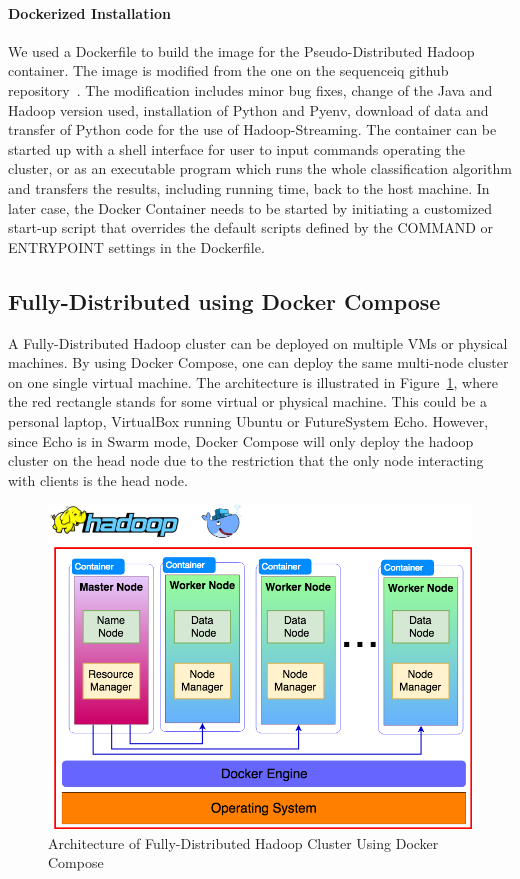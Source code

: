 \paragraph{Dockerized Installation} We used a Dockerfile to build the 
image for the Pseudo-Distributed Hadoop container. The image is
modified from the one on the sequenceiq github
repository~\cite{hid-sp18-405-hadoop-sequenceiq}. The modification
includes minor bug fixes, change of the Java and Hadoop version used,
installation of Python and Pyenv, download of data and transfer of
Python code for the use of Hadoop-Streaming. The container can be
started up with a shell interface for user to input commands operating
the cluster, or as an executable program which runs the whole
classification algorithm and transfers the results, including running
time, back to the host machine. In later case, the Docker Container
needs to be started by initiating a customized start-up script that
overrides the default scripts defined by the COMMAND or ENTRYPOINT
settings in the Dockerfile.


\subsection{Fully-Distributed using Docker Compose}

A Fully-Distributed Hadoop cluster can be deployed on multiple VMs or
physical machines. By using Docker Compose, one can deploy the same
multi-node cluster on one single virtual machine.  The architecture is
illustrated in Figure~\ref{f:hadoop-compose}, where the red rectangle
stands for some virtual or physical machine. This could be a personal
laptop, VirtualBox running Ubuntu or FutureSystem Echo. However, since
Echo is in Swarm mode, Docker Compose will only deploy the hadoop
cluster on the head node due to the restriction that the only node
interacting with clients is the head node.

\begin{figure}[!ht]
	\centering\includegraphics[width=\columnwidth]{images/hadoop-docker-compose.png}
	\caption{Architecture of Fully-Distributed 
		Hadoop Cluster Using Docker Compose}\label{f:hadoop-compose}
\end{figure}

